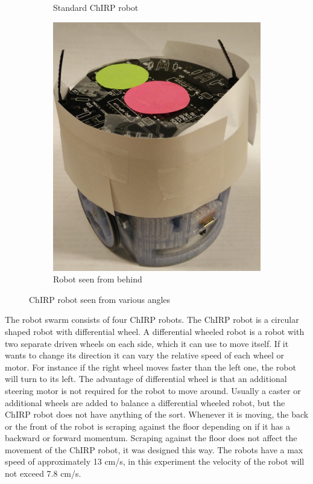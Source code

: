 \begin{figure}[H]
\begin{subfigure}[b]{0.3\textwidth}
        \caption{Standard ChIRP robot}
        \label{fig:robot1}
    \end{subfigure}
    \hfill
    \begin{subfigure}[b]{0.3\textwidth}
        \centering
        \includegraphics[width=\textwidth]{figs/robot3}
        \caption{Robot seen from behind}
        \label{fig:robot3}
    \end{subfigure}
    \caption[ChIRP robot]{ChIRP robot seen from various angles}
    \label{fig:robot}
\end{figure}



The robot swarm consists of four ChIRP robots. The ChIRP robot is a circular shaped robot with differential wheel. A differential wheeled robot is a robot with two separate driven wheels on each side, which it can use to move itself. If it wants to change its direction it can vary the relative speed of each wheel or motor. For instance if the right wheel moves faster than the left one, the robot will turn to its left.
The advantage of differential wheel is that an additional steering motor is not required for the robot to move around. Usually a caster or additional wheels are added to balance a differential wheeled robot, but the ChIRP robot does not have anything of the sort. Whenever it is moving, the back or the front of the robot is scraping against the floor depending on if it has a backward or forward momentum. Scraping against the floor does not affect the movement of the ChIRP robot, it was designed this way. The robots have a max speed of approximately 13 cm/s, in this experiment the velocity of the robot will not exceed 7.8 cm/s. 

